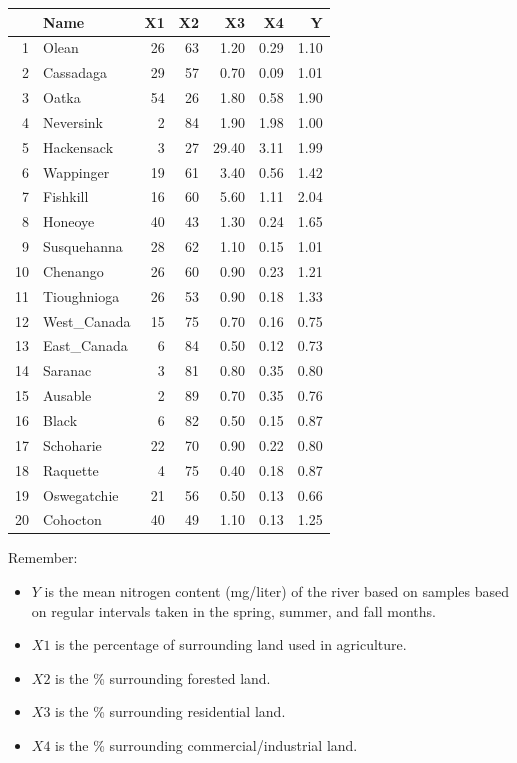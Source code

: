\documentclass{article}\usepackage{graphicx, color}
\numberwithin{equation}{section}
\begin{document}
\begin{flushleft}
\begin{enumerate}[1. ]
\begin{center}
\begin{table}[ht]
\centering
\begin{tabular}{rlrrrrr}
  \hline
 & Name & X1 & X2 & X3 & X4 & Y \\ 
  \hline
1 & Olean &  26 &  63 & 1.20 & 0.29 & 1.10 \\ 
  2 & Cassadaga &  29 &  57 & 0.70 & 0.09 & 1.01 \\ 
  3 & Oatka &  54 &  26 & 1.80 & 0.58 & 1.90 \\ 
  4 & Neversink &   2 &  84 & 1.90 & 1.98 & 1.00 \\ 
  5 & Hackensack &   3 &  27 & 29.40 & 3.11 & 1.99 \\ 
  6 & Wappinger &  19 &  61 & 3.40 & 0.56 & 1.42 \\ 
  7 & Fishkill &  16 &  60 & 5.60 & 1.11 & 2.04 \\ 
  8 & Honeoye &  40 &  43 & 1.30 & 0.24 & 1.65 \\ 
  9 & Susquehanna &  28 &  62 & 1.10 & 0.15 & 1.01 \\ 
  10 & Chenango &  26 &  60 & 0.90 & 0.23 & 1.21 \\ 
  11 & Tioughnioga &  26 &  53 & 0.90 & 0.18 & 1.33 \\ 
  12 & West\_Canada &  15 &  75 & 0.70 & 0.16 & 0.75 \\ 
  13 & East\_Canada &   6 &  84 & 0.50 & 0.12 & 0.73 \\ 
  14 & Saranac &   3 &  81 & 0.80 & 0.35 & 0.80 \\ 
  15 & Ausable &   2 &  89 & 0.70 & 0.35 & 0.76 \\ 
  16 & Black &   6 &  82 & 0.50 & 0.15 & 0.87 \\ 
  17 & Schoharie &  22 &  70 & 0.90 & 0.22 & 0.80 \\ 
  18 & Raquette &   4 &  75 & 0.40 & 0.18 & 0.87 \\ 
  19 & Oswegatchie &  21 &  56 & 0.50 & 0.13 & 0.66 \\ 
  20 & Cohocton &  40 &  49 & 1.10 & 0.13 & 1.25 \\ 
   \hline
\end{tabular}
\end{table}


\end{center}

Remember:
\begin{itemize}
\item $Y$ is the mean nitrogen content (mg/liter) of the river based on samples based on regular intervals taken in the spring, summer, and fall months.
\item $X1$ is the percentage of surrounding land used in agriculture.
\item $X2$ is the \% surrounding forested land.
\item $X3$ is the \% surrounding residential land.
\item $X4$ is the \% surrounding commercial/industrial land.
\end{itemize}


\end{enumerate}
\end{flushleft}
\end{document}
